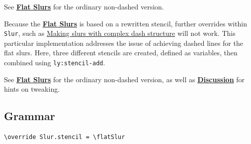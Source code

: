 See \hyperref[sec:flat_slurs]{\textbf{Flat Slurs}} for the ordinary non-dashed version.

Because the \hyperref[sec:flat_slurs]{\textbf{Flat Slurs}} is based on a rewritten stencil, further overrides within \verb|Slur|, such as \href{https://lilypond.org/doc/v2.24/Documentation/notation/expressive-marks-as-curves#Making-slurs-with-complex-dash-structure}{Making slurs with complex dash structure} will not work. This particular implementation addresses the issue of achieving dashed lines for the flat slurs. Here, three different stencils are created, defined as variables, then combined using \verb|ly:stencil-add|.

See \hyperref[sec:flat_slurs]{\textbf{Flat Slurs}} for the ordinary non-dashed version, as well as \hyperref[sec:flat_slurs_discussion]{\textbf{Discussion}} for hints on tweaking.

\subsection{Grammar}
\begin{verbatim}
\override Slur.stencil = \flatSlur
\end{verbatim}

